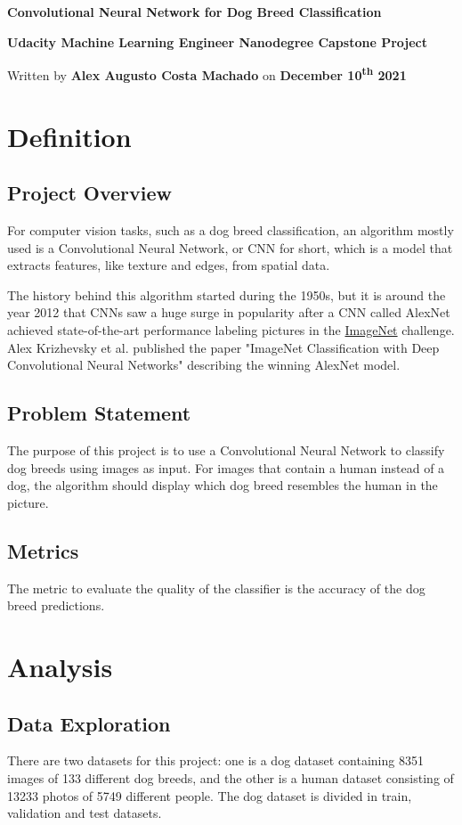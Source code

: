 \documentclass{article}
\newcommand{\doctitle}{Convolutional Neural Network for Dog Breed Classification}
\newcommand{\docsubtitle}{Udacity Machine Learning Engineer Nanodegree Capstone Project}
\newcommand{\docauthor}{Alex Augusto Costa Machado}
\newcommand{\docdate}{December 10\textsuperscript{th} 2021}
\newcommand{\docinfo}{
    \thispagestyle{empty}

    \begin{center}

        \Huge\textbf{\doctitle}
        \vspace{2mm}

        \LARGE\textbf{\docsubtitle}
        
        \vspace{3mm}
        \large
        Written by \textbf{\docauthor} on \textbf{\docdate}

    \end{center}
}
\begin{document}
    \docinfo

    \section{Definition}
    \subsection{Project Overview}

    For computer vision tasks, such as a dog breed classification, an algorithm mostly used is a Convolutional Neural Network, or CNN for short, which is a model that extracts features, like texture and edges, from spatial data.

    The history behind this algorithm started during the 1950s, but it is around the year 2012 that CNNs saw a huge surge in popularity after a CNN called AlexNet achieved state-of-the-art performance labeling pictures in the \href{https://image-net.org/}{ImageNet} challenge. Alex Krizhevsky et al. published the paper "ImageNet Classification with Deep Convolutional Neural Networks" describing the winning AlexNet model.

    \subsection{Problem Statement}

    The purpose of this project is to use a Convolutional Neural Network to classify dog breeds using images as input. For images that contain a human instead of a dog, the algorithm should display which dog breed resembles the human in the picture.

    \subsection{Metrics}

    The metric to evaluate the quality of the classifier is the accuracy of the dog breed predictions.

    \section{Analysis}

    \subsection{Data Exploration}

    There are two datasets for this project: one is a dog dataset containing 8351 images of 133 different dog breeds, and the other is a human dataset consisting of 13233 photos of 5749 different people. The dog dataset is divided in train, validation and test datasets.
\end{document}
